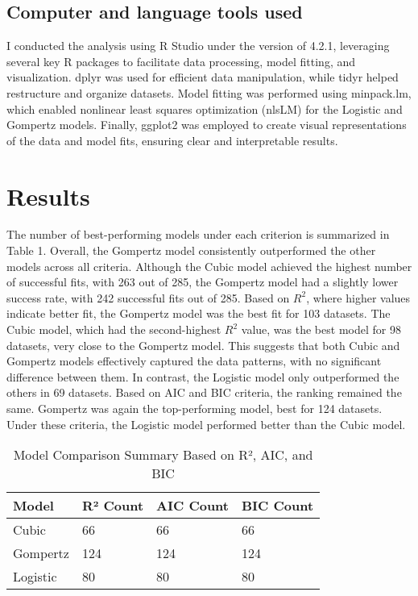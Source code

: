 \documentclass{article}
\begin{document}
 \subsection{Computer and language tools used}
 I conducted the analysis using R Studio under the version of 4.2.1, leveraging several key R packages to facilitate data processing, model fitting, and visualization.  dplyr was used for efficient data manipulation, while tidyr helped restructure and organize datasets. Model fitting was performed using minpack.lm, which enabled nonlinear least squares optimization (nlsLM) for the Logistic and Gompertz models. Finally, ggplot2 was employed to create visual representations of the data and model fits, ensuring clear and interpretable results.

 \section{Results}
 The number of best-performing models under each criterion is summarized in Table 1. Overall, the Gompertz model consistently outperformed the other models across all criteria.
Although the Cubic model achieved the highest number of successful fits, with 263 out of 285, the Gompertz model had a slightly lower success rate, with 242 successful fits out of 285. Based on \( R^2 \), where higher values indicate better fit, the Gompertz model was the best fit for 103 datasets. The Cubic model, which had the second-highest \( R^2 \) value, was the best model for 98 datasets, very close to the Gompertz model. This suggests that both Cubic and Gompertz models effectively captured the data patterns, with no significant difference between them. In contrast, the Logistic model only outperformed the others in 69 datasets.
Based on AIC and BIC criteria, the ranking remained the same. Gompertz was again the top-performing model, best for 124 datasets. Under these criteria, the Logistic model performed better than the Cubic model.
\begin{table}[h!]
  \centering
  \caption{Model Comparison Summary Based on R², AIC, and BIC}
  \label{tab:model_comparison_summary}
  \begin{tabular}{|l|l|l|l|}
    \hline
    \textbf{Model} & \textbf{R² Count} & \textbf{AIC Count} & \textbf{BIC Count} \\ \hline
    Cubic          & 66                & 66                  & 66                  \\ \hline
    Gompertz       & 124               & 124                 & 124                 \\ \hline
    Logistic       & 80                & 80                  & 80                  \\ \hline
  \end{tabular}
\end{table}
\end{document}
